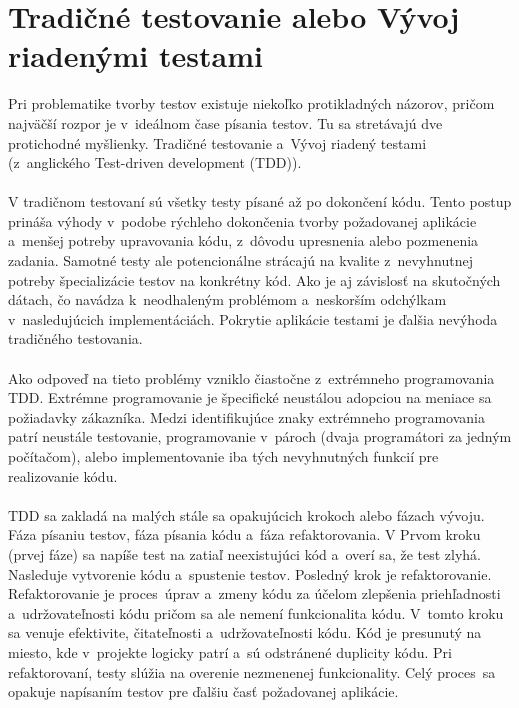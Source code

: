 \documentclass[
  digital, %
  table,   %
oneside,
  nolof,     %
  nolot,     %
]{fithesis3}
\begin{document}
\section{Tradičné testovanie alebo Vývoj riadenými testami}

Pri problematike tvorby testov existuje niekoľko protikladných názorov, pričom najväčší rozpor je v~ideálnom čase písania testov. Tu sa stretávajú dve protichodné myšlienky. Tradičné testovanie a~Vývoj riadený testami (z~anglického  Test-driven development (TDD))\cite{softwareTesting}. \paragraph{}
V tradičnom testovaní sú všetky testy písané až po dokončení kódu. Tento postup prináša výhody v~podobe rýchleho dokončenia tvorby požadovanej aplikácie a~menšej potreby upravovania kódu, z~dôvodu upresnenia alebo pozmenenia zadania.
Samotné testy ale potencionálne strácajú na kvalite z~nevyhnutnej  potreby špecializácie testov na konkrétny kód. Ako je aj závislosť na skutočných dátach, čo navádza k~neodhaleným problémom a~neskorším odchýlkam v~nasledujúcich implementáciách. Pokrytie aplikácie testami je ďalšia nevýhoda tradičného testovania.  \paragraph{}
Ako odpoveď na tieto problémy vzniklo čiastočne z~extrémneho programovania TDD. Extrémne programovanie je špecifické neustálou adopciou na meniace sa požiadavky zákazníka. Medzi identifikujúce znaky extrémneho programovania patrí neustále testovanie, programovanie v~pároch (dvaja programátori za jedným počítačom), alebo implementovanie  iba tých nevyhnutných funkcií pre realizovanie kódu. \paragraph{}
TDD sa zakladá na malých stále sa opakujúcich krokoch alebo fázach vývoju. Fáza písaniu testov, fáza písania kódu a~fáza refaktorovania.
V Prvom kroku (prvej fáze) sa napíše test na zatiaľ neexistujúci kód a~overí sa, že test zlyhá. Nasleduje vytvorenie kódu a~spustenie testov. Posledný krok je refaktorovanie. Refaktorovanie je proces~úprav a~zmeny kódu za účelom zlepšenia priehľadnosti a~udržovateľnosti kódu pričom sa ale nemení funkcionalita kódu. V~tomto kroku sa venuje efektivite, čitateľnosti a~udržovateľnosti kódu. Kód je presunutý na miesto, kde v~projekte logicky patrí a~sú odstránené duplicity kódu. Pri refaktorovaní, testy slúžia na overenie nezmenenej funkcionality. Celý proces~sa opakuje napísaním testov pre ďalšiu časť požadovanej aplikácie.
\end{document}
